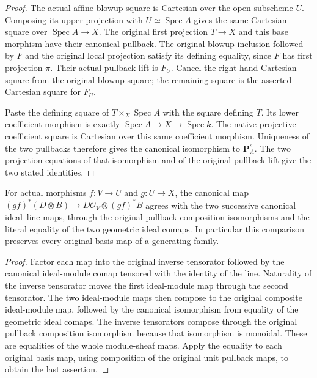 \begin{proof}
The actual affine blowup square is Cartesian over the open subscheme
$U$.  Composing its upper projection with $U\simeq\operatorname{Spec}A$
gives the same Cartesian square over $\operatorname{Spec}A\to X$.
The original first projection $T\to X$ and this base morphism have their
canonical pullback.  The original blowup inclusion followed by $F$ and
the original local projection satisfy its defining equality, since
$F$ has first projection $\pi$.  Their actual pullback lift is $F_U$.
Cancel the right-hand Cartesian square from the original blowup square;
the remaining square is the asserted Cartesian square for $F_U$.

Paste the defining square of $T\times_X\operatorname{Spec}A$ with
the square defining $T$.  Its lower coefficient morphism is exactly
$\operatorname{Spec}A\to X\to\operatorname{Spec}k$.
The native projective coefficient square is Cartesian over this same
coefficient morphism.  Uniqueness of the two pullbacks therefore gives
the canonical isomorphism to $\mathbf P_A^s$.  The two projection
equations of that isomorphism and of the original pullback lift give
the two stated identities.
\end{proof}

\begin{lemma}
\label{lem:kn-nadel-nef-big-comap-tensor-composition}
\notready
{}
For actual morphisms $f:V\to U$ and $g:U\to X$, the canonical map
$(gf)^*(D\otimes B)\to D\mathcal O_V\otimes(gf)^*B$ agrees with
the two successive canonical ideal--line maps, through the original
pullback composition isomorphisms and the literal equality of the two
geometric ideal comaps.  In particular this comparison preserves every
original basis map of a generating family.
\end{lemma}
\begin{proof}
Factor each map into the original inverse tensorator followed by the
canonical ideal-module comap tensored with the identity of the line.
Naturality of the inverse tensorator moves the first ideal-module map
through the second tensorator.  The two ideal-module maps then compose
to the original composite ideal-module map, followed by the canonical
isomorphism from equality of the geometric ideal comaps.  The inverse
tensorators compose through the original pullback composition
isomorphism because that isomorphism is monoidal.  These are equalities
of the whole module-sheaf maps.  Apply the equality to each original
basis map, using composition of the original unit pullback maps, to
obtain the last assertion.
\end{proof}

